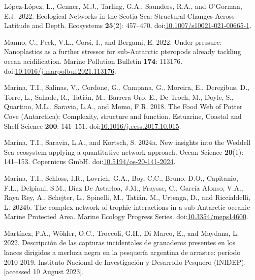 \documentclass[
]{article}
\newlength{\cslhangindent}
\newenvironment{CSLReferences}[2] %
 {\begin{list}{}{%
  \setlength{\itemindent}{0pt}
  \setlength{\leftmargin}{0pt}
  \setlength{\parsep}{0pt}
  \ifodd #1
   \setlength{\leftmargin}{\cslhangindent}
   \setlength{\itemindent}{-1\cslhangindent}
  \fi
  \setlength{\itemsep}{#2\baselineskip}}}
 {\end{list}}
\begin{document}
\begin{CSLReferences}{1}{0}
López-López, L., Genner, M.J., Tarling, G.A., Saunders, R.A., and
O'Gorman, E.J. 2022. Ecological {Networks} in the {Scotia Sea}:
{Structural Changes Across Latitude} and {Depth}. Ecosystems
\textbf{25}(2): 457--470.
doi:\href{https://doi.org/10.1007/s10021-021-00665-1}{10.1007/s10021-021-00665-1}.

Manno, C., Peck, V.L., Corsi, I., and Bergami, E. 2022. Under pressure:
{Nanoplastics} as a further stressor for sub-{Antarctic} pteropods
already tackling ocean acidification. Marine Pollution Bulletin
\textbf{174}: 113176.
doi:\href{https://doi.org/10.1016/j.marpolbul.2021.113176}{10.1016/j.marpolbul.2021.113176}.

Marina, T.I., Salinas, V., Cordone, G., Campana, G., Moreira, E.,
Deregibus, D., Torre, L., Sahade, R., Tatián, M., Barrera Oro, E., De
Troch, M., Doyle, S., Quartino, M.L., Saravia, L.A., and Momo, F.R.
2018. The {Food Web} of {Potter Cove} ({Antarctica}): Complexity,
structure and function. Estuarine, Coastal and Shelf Science
\textbf{200}: 141--151.
doi:\href{https://doi.org/10.1016/j.ecss.2017.10.015}{10.1016/j.ecss.2017.10.015}.

Marina, T.I., Saravia, L.A., and Kortsch, S. 2024a. New insights into
the {Weddell Sea} ecosystem applying a quantitative network approach.
Ocean Science \textbf{20}(1): 141--153. Copernicus GmbH.
doi:\href{https://doi.org/10.5194/os-20-141-2024}{10.5194/os-20-141-2024}.

Marina, T.I., Schloss, I.R., Lovrich, G.A., Boy, C.C., Bruno, D.O.,
Capitanio, F.L., Delpiani, S.M., Díaz De Astarloa, J.M., Fraysse, C.,
García Alonso, V.A., Raya Rey, A., Schejter, L., Spinelli, M., Tatián,
M., Urteaga, D., and Riccialdelli, L. 2024b. The complex network of
trophic interactions in a sub-{Antarctic} oceanic {Marine Protected
Area}. Marine Ecology Progress Series.
doi:\href{https://doi.org/10.3354/meps14600}{10.3354/meps14600}.

Martínez, P.A., Wöhler, O.C., Troccoli, G.H., Di Marco, E., and Maydana,
L. 2022. {Descripci{ó}n de las capturas incidentales de granaderos
presentes en los lances dirigidos a merluza negra en la pesquer{í}a
argentina de arrastre: per{í}odo 2010-2019.} Instituto Nacional de
Investigaci{ó}n y Desarrollo Pesquero (INIDEP). {[}accessed 10 August
2023{]}.


\end{CSLReferences}
\end{document}
